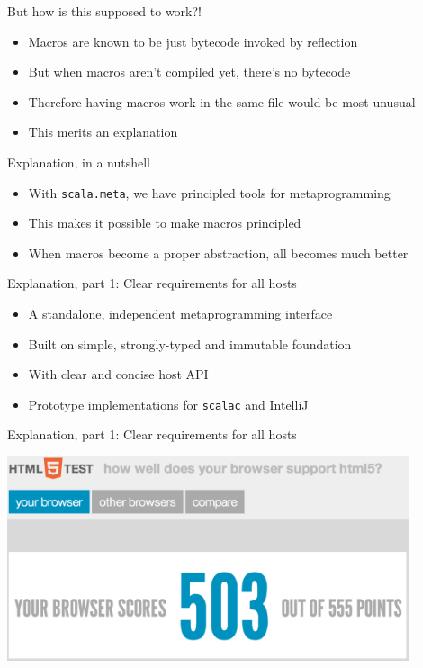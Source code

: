 \documentclass[svgnames,dvipsnames,hyperref={bookmarks=false},usepdftitle=false]{beamer}
\begin{document}
\begin{frame}{But how is this supposed to work?!}
\begin{itemize}
\item Macros are known to be just bytecode invoked by reflection
\item But when macros aren't compiled yet, there's no bytecode
\item Therefore having macros work in the same file would be most unusual
\item This merits an explanation
\end{itemize}
\end{frame}

\begin{frame}{Explanation, in a nutshell}
\begin{itemize}
\item With \texttt{scala.meta}, we have principled tools for metaprogramming
\item This makes it possible to make macros principled
\item When macros become a proper abstraction, all becomes much better
\end{itemize}
\end{frame}

\begin{frame}{Explanation, part 1: Clear requirements for all hosts}
\begin{itemize}
\item A standalone, independent metaprogramming interface
\item Built on simple, strongly-typed and immutable foundation
\item With clear and concise host API
\item Prototype implementations for \texttt{scalac} and IntelliJ
\end{itemize}
\end{frame}

\begin{frame}[c, fragile]{Explanation, part 1: Clear requirements for all hosts}
\begin{center}
\includegraphics[height=6cm]{score.png}
\end{center}
\end{frame}
\end{document}
